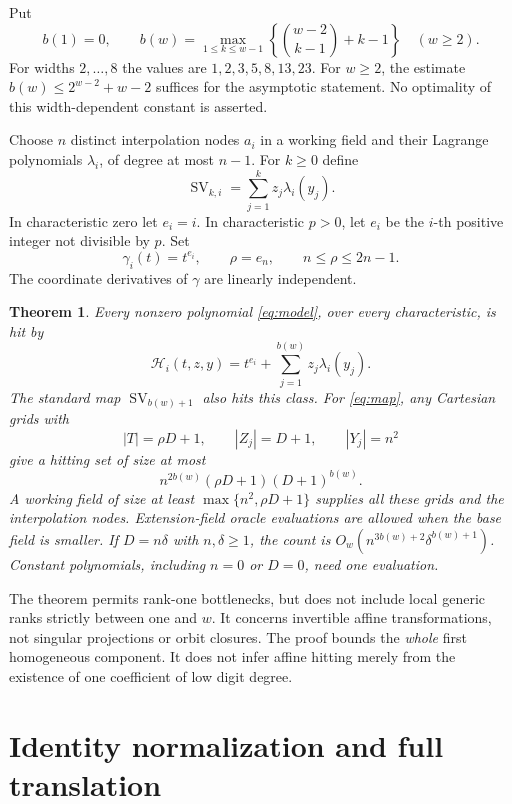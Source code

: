 \documentclass[11pt]{article}
\newtheorem{theorem}{Theorem}[section]
\newcommand{\SV}{\operatorname{SV}}
\begin{document}
Put
\begin{equation}\label{eq:b}
 b(1)=0,\qquad
 b(w)=\max_{1\le k\le w-1}
       \left\{\binom{w-2}{k-1}+k-1\right\}\quad(w\ge2).
\end{equation}
For widths $2,\ldots,8$ the values are $1,2,3,5,8,13,23$.
For $w\ge2$, the estimate $b(w)\le2^{w-2}+w-2$ suffices for the asymptotic statement.
No optimality of this width-dependent constant is asserted.

Choose $n$ distinct interpolation nodes $a_i$ in a working field and
their Lagrange polynomials $\lambda_i$, of degree at most $n-1$.
For $k\ge0$ define
\[
 \SV_{k,i}=\sum_{j=1}^k z_j\lambda_i(y_j).
\]
In characteristic zero let $e_i=i$. In characteristic $p>0$, let $e_i$
be the $i$-th positive integer not divisible by $p$. Set
\[
 \gamma_i(t)=t^{e_i},\qquad \rho=e_n,\qquad n\le\rho\le2n-1.
\]
The coordinate derivatives of $\gamma$ are linearly independent.

\begin{theorem}\label{thm:main}
Every nonzero polynomial \eqref{eq:model}, over every characteristic,
is hit by
\begin{equation}\label{eq:map}
 \mathcal H_i(t,z,y)=t^{e_i}
          +\sum_{j=1}^{b(w)}z_j\lambda_i(y_j).
\end{equation}
The standard map $\SV_{b(w)+1}$ also hits this class.
For \eqref{eq:map}, any Cartesian grids with
\[
 |T|=\rho D+1,\qquad |Z_j|=D+1,\qquad |Y_j|=n^2
\]
give a hitting set of size at most
\begin{equation}\label{eq:count}
 n^{2b(w)}(\rho D+1)(D+1)^{b(w)}.
\end{equation}
A working field of size at least $\max\{n^2,\rho D+1\}$ supplies
all these grids and the interpolation nodes. Extension-field oracle
evaluations are allowed when the base field is smaller.
If $D=n\delta$ with $n,\delta\ge1$, the count is
$O_w(n^{3b(w)+2}\delta^{b(w)+1})$.
Constant polynomials, including $n=0$ or $D=0$, need one evaluation.
\end{theorem}

The theorem permits rank-one bottlenecks, but does not include local
generic ranks strictly between one and $w$. It concerns invertible
affine transformations, not singular projections or orbit closures.
The proof bounds the \emph{whole} first homogeneous component. It does
not infer affine hitting merely from the existence of one coefficient
of low digit degree.

\section{Identity normalization and full translation}
\end{document}
